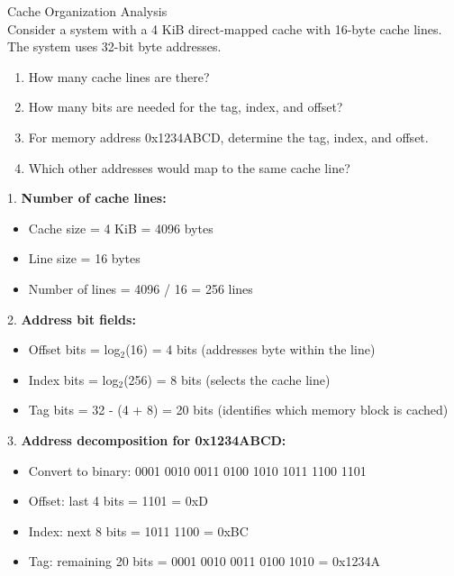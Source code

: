 \begin{example2}{Cache Organization Analysis}\\
Consider a system with a 4 KiB direct-mapped cache with 16-byte cache lines. The system uses 32-bit byte addresses.

\begin{enumerate}
    \item How many cache lines are there?
    \item How many bits are needed for the tag, index, and offset?
    \item For memory address 0x1234ABCD, determine the tag, index, and offset.
    \item Which other addresses would map to the same cache line?
\end{enumerate}

\tcblower

1. \textbf{Number of cache lines:}
   \begin{itemize}
     \item Cache size = 4 KiB = 4096 bytes
     \item Line size = 16 bytes
     \item Number of lines = 4096 / 16 = 256 lines
   \end{itemize}

2. \textbf{Address bit fields:}
   \begin{itemize}
     \item Offset bits = log$_2$(16) = 4 bits (addresses byte within the line)
     \item Index bits = log$_2$(256) = 8 bits (selects the cache line)
     \item Tag bits = 32 - (4 + 8) = 20 bits (identifies which memory block is cached)
   \end{itemize}

3. \textbf{Address decomposition for 0x1234ABCD:}
   \begin{itemize}
     \item Convert to binary: 0001 0010 0011 0100 1010 1011 1100 1101
     \item Offset: last 4 bits = 1101 = 0xD
     \item Index: next 8 bits = 1011 1100 = 0xBC
     \item Tag: remaining 20 bits = 0001 0010 0011 0100 1010 = 0x1234A
   \end{itemize}


\end{example2}
